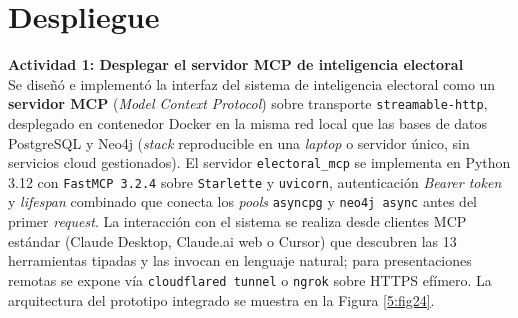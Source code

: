 \documentclass[listof=nochaptergap,12pt,times,authoryear]{report}
\begin{document}
\section{Despliegue}

\textbf{Actividad 1: Desplegar el servidor MCP de inteligencia electoral}
\\
Se diseñó e implementó la interfaz del sistema de inteligencia electoral como un
\textbf{servidor MCP} (\textit{Model Context Protocol}) sobre transporte
\texttt{streamable-http}, desplegado en contenedor Docker en la misma red local
que las bases de datos PostgreSQL y Neo4j (\textit{stack} reproducible en una
\textit{laptop} o servidor único, sin servicios cloud gestionados). El servidor
\texttt{electoral\_mcp} se implementa en Python 3.12 con \texttt{FastMCP 3.2.4}
sobre \texttt{Starlette} y \texttt{uvicorn}, autenticación \textit{Bearer token}
y \textit{lifespan} combinado que conecta los \textit{pools} \texttt{asyncpg} y
\texttt{neo4j async} antes del primer \textit{request}. La interacción con el
sistema se realiza desde clientes MCP estándar (Claude Desktop, Claude.ai web o
Cursor) que descubren las 13 herramientas tipadas y las invocan en lenguaje
natural; para presentaciones remotas se expone vía \texttt{cloudflared tunnel} o
\texttt{ngrok} sobre HTTPS efímero. La arquitectura del prototipo integrado se
muestra en la Figura \ref{5:fig24}.
\end{document}
